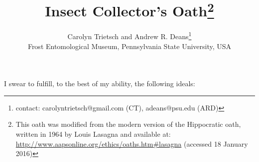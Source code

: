 \documentclass[letterpaper, 10pt]{article}
\begin{document}
\pagestyle{fancy}
\lhead{}
\chead{}
\rhead{}
\lfoot{}
\cfoot{}
\rfoot{\thepage}
\cleanlookdateon

\title{Insect Collector's Oath\footnote{This oath was modified from the modern version of the Hippocratic oath, written in 1964 by Louis Lasagna and available at: \url{http://www.aapsonline.org/ethics/oaths.htm\#lasagna} (accessed 18 January 2016)}}%
\author{Carolyn Trietsch and Andrew R. Deans\footnote{contact: carolyntrietsch@gmail.com (CT),  adeans@psu.edu (ARD)}\\
Frost Entomological Museum, Pennsylvania State University, USA}

\maketitle
\thispagestyle{empty}
\noindent{}I swear to fulfill, to the best of my ability, the following ideals:
\end{document}
